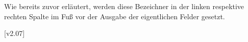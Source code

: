 \begin{Bundle*}[v2.05]{}
\begin{Declaration}{}
\begin{Declaration}{}
\begin{Declaration}{}
\printdeclarationlist%
%
Wie bereits zuvor erläutert, werden diese Bezeichner in der linken respektive 
rechten Spalte im Fuß vor der Ausgabe der eigentlichen Felder gesetzt.
\end{Declaration}
\end{Declaration}
\end{Declaration}

[v2.07]
\end{Bundle*}
